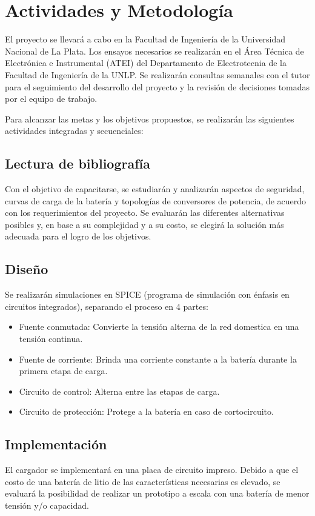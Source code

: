 \section{Actividades y Metodología}


El proyecto se llevará a cabo en la Facultad de Ingeniería de la Universidad Nacional de La Plata.
Los ensayos necesarios se realizarán en el Área Técnica de Electrónica e Instrumental (ATEI)
del Departamento de Electrotecnia de la Facultad de Ingeniería de la UNLP.
Se realizarán consultas semanales con el tutor para el seguimiento del desarrollo del proyecto y
la revisión de decisiones tomadas por el equipo de trabajo.

Para alcanzar las metas y los objetivos propuestos, se realizarán las siguientes actividades integradas y secuenciales:

\subsection{Lectura de bibliografía}
Con el objetivo de capacitarse, se estudiarán y analizarán aspectos de seguridad, curvas de carga de la batería 
y topologías de conversores de potencia, de acuerdo con los requerimientos del proyecto. 
Se evaluarán las diferentes alternativas posibles y,
en base a su complejidad y a su costo,
se elegirá la solución más adecuada para el logro de los objetivos. 

\subsection{Diseño}
Se realizarán simulaciones en SPICE (programa de simulación con énfasis en circuitos integrados),
separando el proceso en 4 partes:
\begin{itemize}
    \item Fuente conmutada: Convierte la tensión alterna de la red domestica en una tensión continua.
    \item Fuente de corriente: Brinda una corriente constante a la batería durante la primera etapa de carga.
    \item Circuito de control: Alterna entre las etapas de carga.
    \item Circuito de protección: Protege a la batería en caso de cortocircuito.
\end{itemize}

\subsection{Implementación}
El cargador se implementará en una placa de circuito impreso.
Debido a que el costo de una batería de litio de las características necesarias es elevado,
se evaluará la posibilidad de realizar un prototipo a escala con una batería de menor tensión y/o capacidad.


